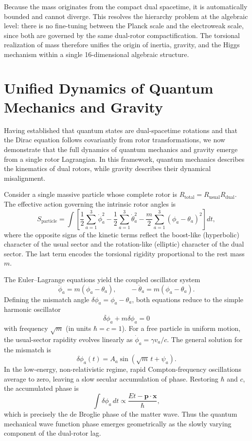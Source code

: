 \documentclass[dvipdfmx,11pt,a4paper]{article}
\begin{document}
Because the mass originates from the compact dual spacetime, it is automatically bounded and cannot diverge. This resolves the hierarchy problem at the algebraic level: there is no fine-tuning between the Planck scale and the electroweak scale, since both are governed by the same dual-rotor compactification. The torsional realization of mass therefore unifies the origin of inertia, gravity, and the Higgs mechanism within a single 16-dimensional algebraic structure.

\section{Unified Dynamics of Quantum Mechanics and Gravity}
\label{sec:dynamics}

Having established that quantum states are dual-spacetime rotations and that the Dirac equation follows covariantly from rotor transformations, we now demonstrate that the full dynamics of quantum mechanics and gravity emerge from a single rotor Lagrangian. In this framework, quantum mechanics describes the kinematics of dual rotors, while gravity describes their dynamical misalignment.

Consider a single massive particle whose complete rotor is $R_\text{total} = R_\text{usual} R_\text{dual}$. The effective action governing the intrinsic rotor angles is
\[
S_\text{particle} = \int \left[ \frac{1}{2} \sum_{a=1}^3 \dot{\phi}_a^2 - \frac{1}{2} \sum_{a=1}^3 \dot{\theta}_a^2 - \frac{m}{2} \sum_{a=1}^3 (\phi_a - \theta_a)^2 \right] dt,
\]
where the opposite signs of the kinetic terms reflect the boost-like (hyperbolic) character of the usual sector and the rotation-like (elliptic) character of the dual sector. The last term encodes the torsional rigidity proportional to the rest mass $m$.

The Euler--Lagrange equations yield the coupled oscillator system
\[
\ddot{\phi}_a = m (\phi_a - \theta_a), \qquad -\ddot{\theta}_a = m (\phi_a - \theta_a).
\]
Defining the mismatch angle $\delta\phi_a = \phi_a - \theta_a$, both equations reduce to the simple harmonic oscillator
\[
\ddot{\delta\phi}_a + m \delta\phi_a = 0
\]
with frequency $\sqrt{m}$ (in units $\hbar = c = 1$). For a free particle in uniform motion, the usual-sector rapidity evolves linearly as $\dot{\phi}_a = \gamma v_a/c$. The general solution for the mismatch is
\[
\delta\phi_a(t) = A_a \sin(\sqrt{m}\, t + \psi_a).
\]
In the low-energy, non-relativistic regime, rapid Compton-frequency oscillations average to zero, leaving a slow secular accumulation of phase. Restoring $\hbar$ and $c$, the accumulated phase is
\[
\int \delta\phi_a \, dt \propto \frac{E t - \mathbf{p} \cdot \mathbf{x}}{\hbar},
\]
which is precisely the de Broglie phase of the matter wave. Thus the quantum mechanical wave function phase emerges geometrically as the slowly varying component of the dual-rotor lag.
\end{document}
